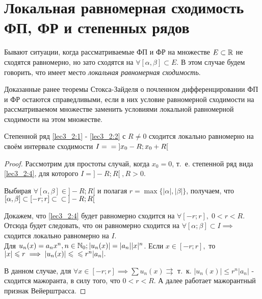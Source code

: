\documentclass[../../main.tex]{subfiles}
\begin{document}
\section{Локальная равномерная сходимость ФП, ФР и степенных рядов}
Бывают ситуации, когда рассматриваемые ФП и ФР на множестве $E \subset \R$ 
не сходятся равномерно, но зато сходятся на $\forall [\alpha, 
\beta] \subset E$. В этом случае будем говорить, что имеет место 
\emph{локальная равномерная сходимость}.

Доказанные ранее теоремы Стокса-Зайделя о почленном 
дифференцировании ФП и ФР
остаются справедливыми, если в них условие равномерной сходимости 
на рассматриваемом множестве заменить условиями 
локальной равномерной сходимости на этом множестве.

\begin{thm}
	Степенной ряд \eqref{lec3_2:1} - \eqref{lec3_2:2} с $R \ne 0 $ 
	сходится локально равномерно
	на своём интервале сходимости  $I = \\ = \; ]x_0 - R; x_0 + R[$
\end{thm}

\begin{proof}
	Рассмотрим для простоты случай, когда $x_0 = 0$, т.~е. 
	степенной ряд вида \eqref{lec3_2:4}, для которого $I = ]-R; R[ \; , R > 0$.
	
	Выбирая $\forall [\alpha, \beta] \in ]-R; R[$ и полагая 
	$r = \max \{|\alpha|, |\beta|\}$, получаем, что $[\alpha, 
	\beta] \subset [-r; r] \subset \\ \subset \: ]-R; R[$
	
	Докажем, что \eqref{lec3_2:4} будет равномерно сходится на 
	$\forall [-r; r], \; 
	0 < r < R.$ Отсюда будет следовать, что он равномерно сходится на 
	$\forall [\alpha; \beta] \subset I \implies$ сходится 
	локально равномерно на $I$. \\
	Для $u_n(x) = a_n x^n, n \in \N_0; |u_n(x)| = |a_n||x|^n$. 
	Если $x \in [-r; r],$ то $|x| \le r \implies |u_n(x)| \le \\ \le r^n|a_n|.$
	
	В данном случае, для $\forall x \in [-r; r] \implies 
	\sum u_n(x) \rightrightarrows$ т.~к. $|u_n(x)| \le r^n|a_n|$ 
	- сходится мажоранта, в силу того, что $0 < r < R$.
	А далее работает мажорантный признак Вейерштрасса.
\end{proof}
\end{document}

